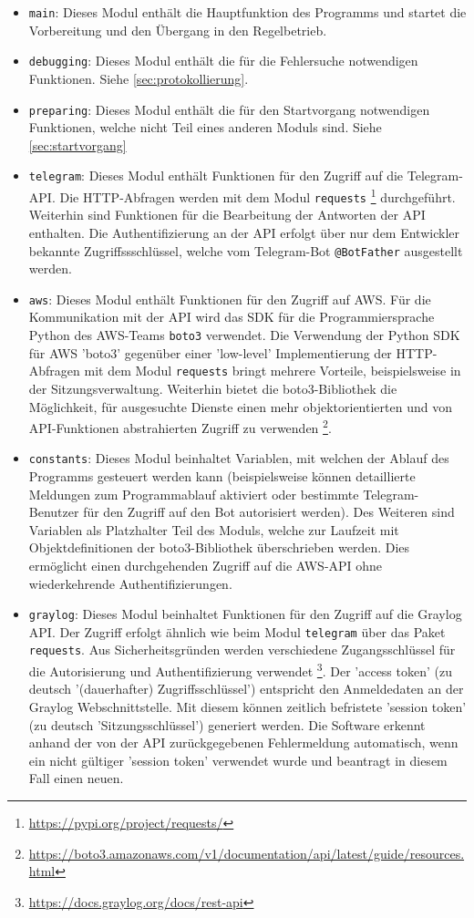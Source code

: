 \begin{itemize}
\item \lstinline{main}: Dieses Modul enthält die Hauptfunktion des Programms und startet die Vorbereitung und den Übergang in den Regelbetrieb.
\item \lstinline{debugging}: Dieses Modul enthält die für die Fehlersuche notwendigen Funktionen. Siehe \autoref{sec:protokollierung}.
\item \lstinline{preparing}: Dieses Modul enthält die für den Startvorgang notwendigen Funktionen, welche nicht Teil eines anderen Moduls sind. Siehe \autoref{sec:startvorgang}
\item \lstinline{telegram}: Dieses Modul enthält Funktionen für den Zugriff auf die Telegram-API. Die HTTP-Abfragen werden mit dem Modul \lstinline{requests} \footnote{\url{https://pypi.org/project/requests/}} durchgeführt. Weiterhin sind Funktionen für die Bearbeitung der Antworten der API enthalten. Die Authentifizierung an der API erfolgt über nur dem Entwickler bekannte Zugriffssschlüssel, welche vom Telegram-Bot \lstinline{@BotFather} ausgestellt werden.
\item \lstinline{aws}: Dieses Modul enthält Funktionen für den Zugriff auf AWS. Für die Kommunikation mit der API wird das SDK für die Programmiersprache Python des AWS-Teams \lstinline{boto3} verwendet. Die Verwendung der Python SDK für AWS 'boto3' gegenüber einer 'low-level' Implementierung der HTTP-Abfragen mit dem Modul \lstinline{requests} bringt mehrere Vorteile, beispielsweise in der Sitzungsverwaltung. Weiterhin bietet die boto3-Bibliothek die Möglichkeit, für ausgesuchte Dienste einen mehr objektorientierten und von API-Funktionen abstrahierten Zugriff zu verwenden \footnote{\url{https://boto3.amazonaws.com/v1/documentation/api/latest/guide/resources.html}}.
\item \lstinline{constants}: Dieses Modul beinhaltet Variablen, mit welchen der Ablauf des Programms gesteuert werden kann (beispielsweise können detaillierte Meldungen zum Programmablauf aktiviert oder bestimmte Telegram-Benutzer für den Zugriff auf den Bot autorisiert werden). Des Weiteren sind Variablen als Platzhalter Teil des Moduls, welche zur Laufzeit mit Objektdefinitionen der boto3-Bibliothek überschrieben werden. Dies ermöglicht einen durchgehenden Zugriff auf die AWS-API ohne wiederkehrende Authentifizierungen.
\item \lstinline{graylog}: Dieses Modul beinhaltet Funktionen für den Zugriff auf die Graylog API. Der Zugriff erfolgt ähnlich wie beim Modul \lstinline{telegram} über das Paket \lstinline{requests}. Aus Sicherheitsgründen werden verschiedene Zugangsschlüssel für die Autorisierung und Authentifizierung verwendet \footnote{\url{https://docs.graylog.org/docs/rest-api}}. Der 'access token' (zu deutsch '(dauerhafter) Zugriffsschlüssel') entspricht den Anmeldedaten an der Graylog Webschnittstelle. Mit diesem können zeitlich befristete 'session token' (zu deutsch 'Sitzungsschlüssel') generiert werden. Die Software erkennt anhand der von der API zurückgegebenen Fehlermeldung automatisch, wenn ein nicht gültiger 'session token' verwendet wurde und beantragt in diesem Fall einen neuen.

\end{itemize}
